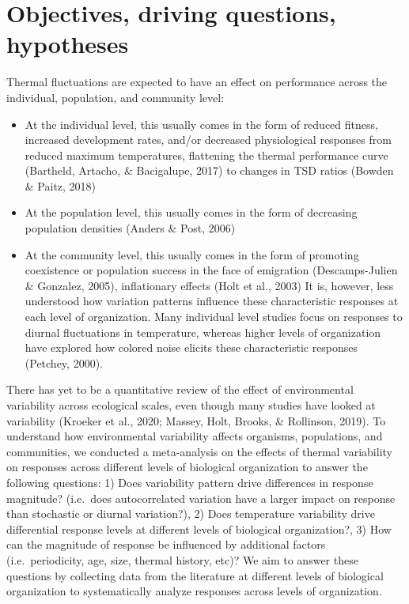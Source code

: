 \documentclass[12pt,twoside]{reedthesis}
\begin{document}
\hypertarget{objectives-driving-questions-hypotheses}{%
\section{Objectives, driving questions, hypotheses}\label{objectives-driving-questions-hypotheses}}

Thermal fluctuations are expected to have an effect on performance across the individual, population, and community level:
\begin{itemize}
\item
  At the individual level, this usually comes in the form of reduced fitness, increased development rates, and/or decreased physiological responses from reduced maximum temperatures, flattening the thermal performance curve (Bartheld, Artacho, \& Bacigalupe, 2017) to changes in TSD ratios (Bowden \& Paitz, 2018)
\item
  At the population level, this usually comes in the form of decreasing population densities (Anders \& Post, 2006)
\item
  At the community level, this usually comes in the form of promoting coexistence or population success in the face of emigration (Descamps-Julien \& Gonzalez, 2005), inflationary effects (Holt et al., 2003)
  It is, however, less understood how variation patterns influence these characteristic responses at each level of organization. Many individual level studies focus on responses to diurnal fluctuations in temperature, whereas higher levels of organization have explored how colored noise elicits these characteristic responses (Petchey, 2000).
\end{itemize}
There has yet to be a quantitative review of the effect of environmental variability across ecological scales, even though many studies have looked at variability (Kroeker et al., 2020; Massey, Holt, Brooks, \& Rollinson, 2019). To understand how environmental variability affects organisms, populations, and communities, we conducted a meta-analysis on the effects of thermal variability on responses across different levels of biological organization to answer the following questions: 1) Does variability pattern drive differences in response magnitude? (i.e.~does autocorrelated variation have a larger impact on response than stochastic or diurnal variation?), 2) Does temperature variability drive differential response levels at different levels of biological organization?, 3) How can the magnitude of response be influenced by additional factors (i.e.~periodicity, age, size, thermal history, etc)? We aim to answer these questions by collecting data from the literature at different levels of biological organization to systematically analyze responses across levels of organization.
\end{document}
